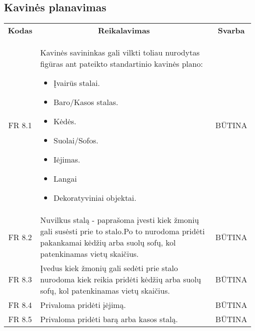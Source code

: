 \documentclass{VUMIFPSkursinis}
\begin{document}
\subsection{Kavinės planavimas}
\begin{center}
	\begin{table}[H]
	\begin{tabular}{|p{2cm}|p{}|p{}|}
	
	\hline
	    \rowcolor{lightgray}
		\multicolumn{3}{|c|}{Kavinės planavimas}\\
		
	\hline
		\multicolumn{1}{|c|}{{\bfseries Kodas}}&
		\multicolumn{1}{|c|}{{\bfseries Reikalavimas}}&
		\multicolumn{1}{|c|}{{\bfseries Svarba}}\\

	\hline
		\multicolumn{1}{|c|}{FR 8.1}&
		{Kavinės savininkas gali vilkti toliau nurodytas figūras ant pateikto standartinio kavinės plano:
		\begin{itemize}
			\item Įvairūs stalai.
			\item Baro/Kasos stalas.
			\item Kėdės.
			\item Suolai/Sofos.
			\item Iėjimas.
			\item Langai
			\item Dekoratyviniai objektai.
		\end{itemize}}&
		\multicolumn{1}{|c|}{BŪTINA}\\

	\hline
	
		\multicolumn{1}{|c|}{FR 8.2}&
		{Nuvilkus stalą - paprašoma įvesti kiek žmonių gali susėsti prie to stalo.Po to nurodoma pridėti pakankamai kėdžių arba suolų sofų, kol patenkinamas vietų skaičius.}&
		\multicolumn{1}{|c|}{BŪTINA}\\				
	\hline
	
		\multicolumn{1}{|c|}{FR 8.3}&
		{Įvedus kiek žmonių gali sedėti prie stalo nurodoma kiek reikia pridėti kėdžių arba suolų sofų, kol patenkinamas vietų skaičius.}&
		\multicolumn{1}{|c|}{BŪTINA}\\				
	\hline
	
		\multicolumn{1}{|c|}{FR 8.4}&
		{Privaloma pridėti įėjimą.}&
		\multicolumn{1}{|c|}{BŪTINA}\\				
	\hline
	
		\multicolumn{1}{|c|}{FR 8.5}&
		{Privaloma pridėti barą arba kasos stalą.}&
		\multicolumn{1}{|c|}{BŪTINA}\\				
	\hline
	

\end{tabular}
\end{table}
\end{center}
\end{document}

